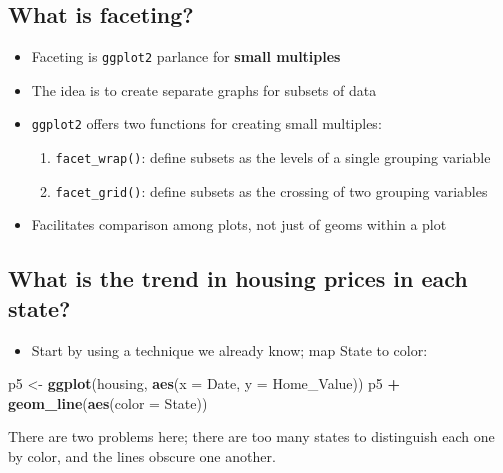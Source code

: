 \documentclass[]{book}
\newenvironment{Shaded}{\begin{snugshade}}{\end{snugshade}}
\newcommand{\KeywordTok}[1]{\textcolor[rgb]{0.13,0.29,0.53}{\textbf{#1}}}
\newcommand{\DataTypeTok}[1]{\textcolor[rgb]{0.13,0.29,0.53}{#1}}
\newcommand{\StringTok}[1]{\textcolor[rgb]{0.31,0.60,0.02}{#1}}
\newcommand{\OperatorTok}[1]{\textcolor[rgb]{0.81,0.36,0.00}{\textbf{#1}}}
\newcommand{\NormalTok}[1]{#1}
\providecommand{\tightlist}{%
  \setlength{\itemsep}{0pt}\setlength{\parskip}{0pt}}
\begin{document}
\subsection{What is faceting?}\label{what-is-faceting}

\begin{itemize}
\tightlist
\item
  Faceting is \texttt{ggplot2} parlance for \textbf{small multiples}
\item
  The idea is to create separate graphs for subsets of data
\item
  \texttt{ggplot2} offers two functions for creating small multiples:

  \begin{enumerate}
  \def\labelenumi{\arabic{enumi}.}
  \tightlist
  \item
    \texttt{facet\_wrap()}: define subsets as the levels of a single
    grouping variable
  \item
    \texttt{facet\_grid()}: define subsets as the crossing of two
    grouping variables
  \end{enumerate}
\item
  Facilitates comparison among plots, not just of geoms within a plot
\end{itemize}

\subsection{What is the trend in housing prices in each
state?}\label{what-is-the-trend-in-housing-prices-in-each-state}

\begin{itemize}
\tightlist
\item
  Start by using a technique we already know; map State to color:
\end{itemize}

\begin{Shaded}
\begin{Highlighting}[]
\NormalTok{p5 <-}\StringTok{ }\KeywordTok{ggplot}\NormalTok{(housing, }\KeywordTok{aes}\NormalTok{(}\DataTypeTok{x =}\NormalTok{ Date, }\DataTypeTok{y =}\NormalTok{ Home_Value))}
\NormalTok{p5 }\OperatorTok{+}\StringTok{ }\KeywordTok{geom_line}\NormalTok{(}\KeywordTok{aes}\NormalTok{(}\DataTypeTok{color =}\NormalTok{ State))  }
\end{Highlighting}
\end{Shaded}

There are two problems here; there are too many states to distinguish
each one by color, and the lines obscure one another.
\end{document}
